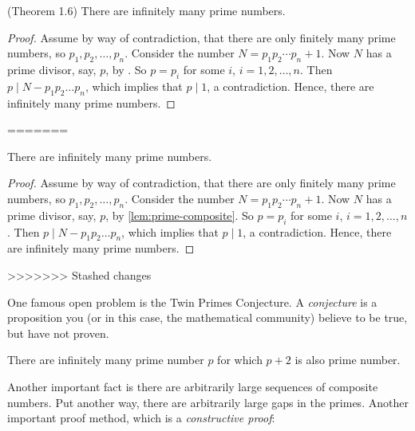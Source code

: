 \documentclass{ximera}
\begin{document}
\begin{defn}
\begin{theorem}\label{thm:inf-primes}(Theorem 1.6)
 There are infinitely many prime numbers.
\end{theorem}
\begin{proof}
 Assume by way of contradiction, that there are only finitely many prime numbers, so $p_1,p_2,\dots,p_n$. Consider the number $N=p_1p_2\cdots p_n +1$. Now $N$ has a prime divisor, say, $p$, by . So $p=p_i$ for some $i$, $i=1,2,\dots,n$. Then $p\mid N-p_1p_2\dots p_n$, which implies that $p\mid 1$, a contradiction. Hence, there are infinitely many prime numbers.
\end{proof}
=======



\begin{theorem}\label{thm:inf-primes}
  There are infinitely many prime numbers.

  \begin{proof}
    Assume by way of contradiction, that there are only finitely many prime numbers, so $p_1,p_2,\dots,p_n$. Consider the number $N=p_1p_2\cdots p_n +1$. Now $N$ has a prime divisor, say, $p$, by \cref{lem:prime-composite}. So $p=p_i$ for some $i$, $i=1,2,\dots,n$. Then $p\mid N-p_1p_2\dots p_n$, which implies that $p\mid 1$, a contradiction. Hence, there are infinitely many prime numbers.
  \end{proof}
\end{theorem}
>>>>>>> Stashed changes

One famous open problem is the Twin Primes Conjecture. A \emph{conjecture} is a proposition you (or in this case, the mathematical community) believe to be true, but have not proven.

\begin{conjecture}\label{conj:twin-primes}
  There are infinitely many prime number $p$ for which $p+2$ is also prime number.
\end{conjecture}

Another important fact is there are arbitrarily large sequences of composite numbers. Put another way, there are arbitrarily large gaps in the primes. Another important proof method, which is a \emph{constructive proof}:


\end{defn}
\end{document}
